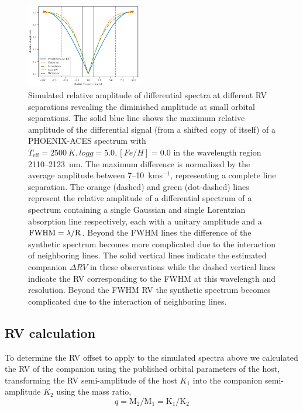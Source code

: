 \begin{figure}
	\includegraphics[width=0.45\textwidth]{figures/direct-recovery/rv_diff_final.pdf}
	\caption{Simulated relative amplitude of differential spectra at different RV separations revealing the diminished amplitude at small orbital separations. The solid blue line shows the maximum relative amplitude of the differential signal (from a shifted copy of itself) of a PHOENIX-ACES spectrum with \(T_{\textrm{eff}}=2500~K, logg=5.0, [Fe/H]=0.0\) in the wavelength region 2110--2123~nm. The maximum difference is normalized by the average amplitude between 7--10~kms\(^{-1}\), representing a complete line separation. The orange (dashed) and green (dot-dashed) lines represent the relative amplitude of a differential spectrum of a spectrum containing a single Gaussian and single Lorentzian absorption line respectively, each with a unitary amplitude and a \(\rm FWHM = \lambda / R \). Beyond the FWHM lines the difference of the synthetic spectrum becomes more complicated due to the interaction of neighboring lines. The solid vertical lines indicate the estimated companion \(\Delta RV\) in these observations while the dashed vertical lines indicate the RV corresponding to the FWHM at this wavelength and resolution. Beyond the FWHM RV the synthetic spectrum becomes complicated due to the interaction of neighboring lines.}
	
	\label{fig:diff_amp}
\end{figure}


\subsection{RV calculation}
To determine the RV offset to apply to the simulated spectra above we calculated the RV of the companion using the published orbital parameters of the host, transforming the RV semi-amplitude of the host \(K_{1} \) into the companion semi-amplitude \(K_{2} \) using the mass ratio,
\begin{equation}
\label{eqn:mass_ratio}
q = \textrm{M}_{2} / \textrm{M}_{1} = \textrm{K}_{1} / \textrm{K}_{2}
\end{equation}


